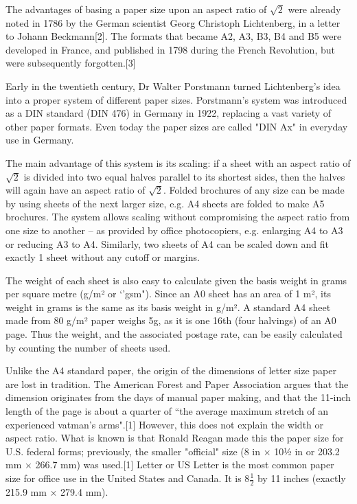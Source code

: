 The advantages of basing a paper size upon an aspect ratio of $\surd{2}$ were already noted in 1786 by the German scientist Georg Christoph Lichtenberg, in a letter to Johann Beckmann[2]. The formats that became A2, A3, B3, B4 and B5 were developed in France, and published in 1798 during the French Revolution, but were subsequently forgotten.[3]

Early in the twentieth century, Dr Walter Porstmann turned Lichtenberg's idea into a proper system of different paper sizes. Porstmann's system was introduced as a DIN standard (DIN 476) in Germany in 1922, replacing a vast variety of other paper formats. Even today the paper sizes are called "DIN Ax" in everyday use in Germany.

The main advantage of this system is its scaling: if a sheet with an aspect ratio of $\surd{2}$ is divided into two equal halves parallel to its shortest sides, then the halves will again have an aspect ratio of $\surd{2}$. Folded brochures of any size can be made by using sheets of the next larger size, e.g. A4 sheets are folded to make A5 brochures. The system allows scaling without compromising the aspect ratio from one size to another – as provided by office photocopiers, e.g. enlarging A4 to A3 or reducing A3 to A4. Similarly, two sheets of A4 can be scaled down and fit exactly 1 sheet without any cutoff or margins.

The weight of each sheet is also easy to calculate given the basis weight in grams per square metre (g/m² or `'gsm"). Since an A0 sheet has an area of 1 m², its weight in grams is the same as its basis weight in g/m². A standard A4 sheet made from 80 g/m² paper weighs 5g, as it is one 16th (four halvings) of an A0 page. Thus the weight, and the associated postage rate, can be easily calculated by counting the number of sheets used.

Unlike the A4 standard paper, the origin of the dimensions of letter size paper are lost in tradition. The American Forest and Paper Association argues that the dimension originates from the days of manual paper making, and that the 11-inch length of the page is about a quarter of ``the average maximum stretch of an experienced vatman's arms".[1] However, this does not explain the width or aspect ratio. What is known is that Ronald Reagan made this the paper size for U.S. federal forms; previously, the smaller "official" size (8 in × 10½ in or 203.2 mm × 266.7 mm) was used.[1] Letter or US Letter is the most common paper size for office use in the United States and Canada. It is 8$\frac{1}{2}$ by 11 inches (exactly 215.9 mm × 279.4 mm).

